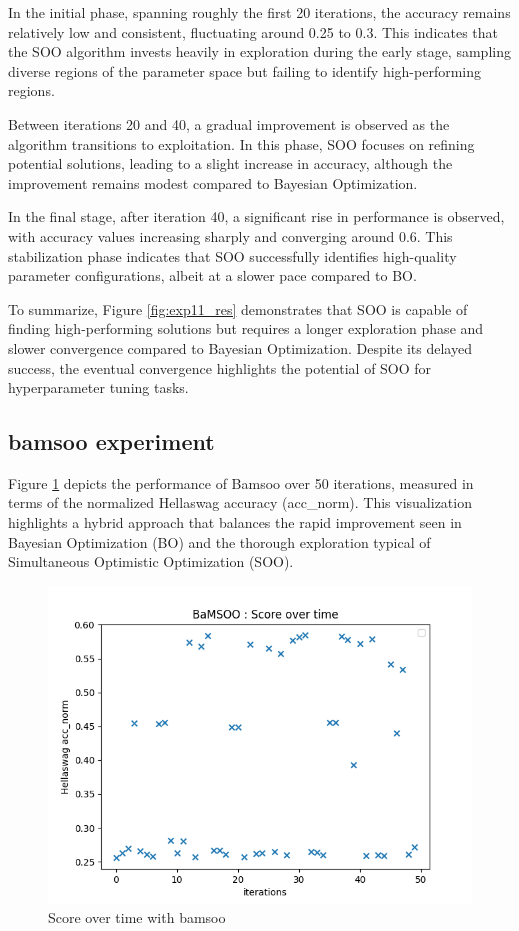 In the initial phase, spanning roughly the first 20 iterations, the accuracy remains relatively low and consistent, fluctuating around 0.25 to 0.3. This indicates that the SOO algorithm invests heavily in exploration during the early stage, sampling diverse regions of the parameter space but failing to identify high-performing regions.

Between iterations 20 and 40, a gradual improvement is observed as the algorithm transitions to exploitation. In this phase, SOO focuses on refining potential solutions, leading to a slight increase in accuracy, although the improvement remains modest compared to Bayesian Optimization.

In the final stage, after iteration 40, a significant rise in performance is observed, with accuracy values increasing sharply and converging around 0.6. This stabilization phase indicates that SOO successfully identifies high-quality parameter configurations, albeit at a slower pace compared to BO.

To summarize, Figure \ref{fig:exp11_res} demonstrates that SOO is capable of finding high-performing solutions but requires a longer exploration phase and slower convergence compared to Bayesian Optimization. Despite its delayed success, the eventual convergence highlights the potential of SOO for hyperparameter tuning tasks.

\subsection{\acrshort{bamsoo} experiment}
\label{sec:bamsoo_exp}
Figure \ref{fig:bamsoo_score_time} depicts the performance of Bamsoo over 50 iterations, measured in terms of the normalized Hellaswag accuracy (acc\_norm). This visualization highlights a hybrid approach that balances the rapid improvement seen in Bayesian Optimization (BO) and the thorough exploration typical of Simultaneous Optimistic Optimization (SOO).

\begin{figure}[h!] \centering \includegraphics[width=0.4\linewidth]{assets/img/chap_4/experiments/plots/exp11_score_over_time.png} \caption{Score over time with \acrshort{bamsoo}} \label{fig:bamsoo_score_time} \end{figure}

